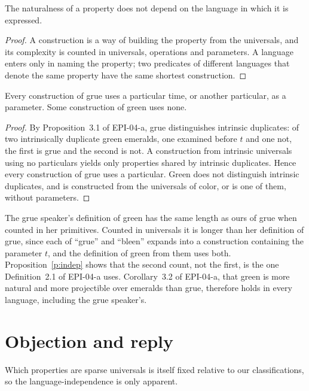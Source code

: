 \documentclass{situationist-preprint}
\begin{document}
\begin{proposition}\label{p:indep}
The naturalness of a property does not depend on the language in which it is expressed.
\end{proposition}

\begin{proof}
A construction is a way of building the property from the universals, and its complexity is counted in universals, operations and parameters. A language enters only in naming the property; two predicates of different languages that denote the same property have the same shortest construction.
\end{proof}

\begin{proposition}\label{p:param}
Every construction of grue uses a particular time, or another particular, as a parameter. Some construction of green uses none.
\end{proposition}

\begin{proof}
By Proposition~3.1 of EPI-04-a, grue distinguishes intrinsic duplicates: of two intrinsically duplicate green emeralds, one examined before $t$ and one not, the first is grue and the second is not. A construction from intrinsic universals using no particulars yields only properties shared by intrinsic duplicates. Hence every construction of grue uses a particular. Green does not distinguish intrinsic duplicates, and is constructed from the universals of color, or is one of them, without parameters.
\end{proof}

The grue speaker's definition of green has the same length as ours of grue when counted in her primitives. Counted in universals it is longer than her definition of grue, since each of \enquote{grue} and \enquote{bleen} expands into a construction containing the parameter $t$, and the definition of green from them uses both. Proposition~\ref{p:indep} shows that the second count, not the first, is the one Definition~2.1 of EPI-04-a uses. Corollary~3.2 of EPI-04-a, that green is more natural and more projectible over emeralds than grue, therefore holds in every language, including the grue speaker's.

\section{Objection and reply}

\begin{objection}
Which properties are sparse universals is itself fixed relative to our classifications, so the language-independence is only apparent.
\end{objection}
\end{document}
